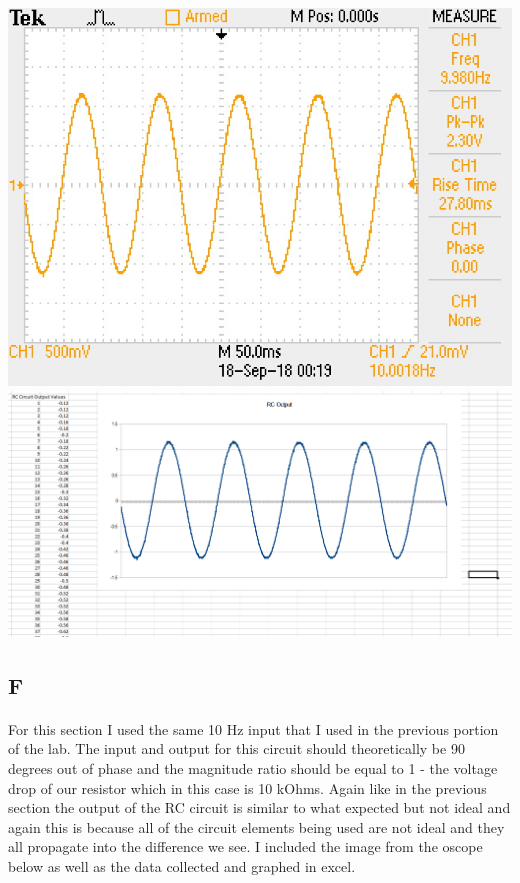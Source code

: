 \documentclass[12pt]{article}
\begin{document}
				\begin{center}
					\includegraphics[scale=0.6]{output.jpg}\\
					\vspace{1cm}
					\includegraphics[scale=0.15]{eoutput.png}
				\end{center}
		
		\subsection{F}
			\paragraph{}
				For this section I used the same 10 Hz input that I used in the previous portion of the lab.  The input and output for this circuit should
				theoretically be 90 degrees out of phase and the magnitude ratio should be equal to 1 - the voltage drop of our resistor which in this
				case is 10 kOhms.  Again like in the previous section the output of the RC circuit is similar to what expected but not ideal and again this is
				because all of the circuit elements being used are not ideal and they all propagate into the difference we see.  I included the image from 
				the oscope below as well as the data collected and graphed in excel.
\end{document}
